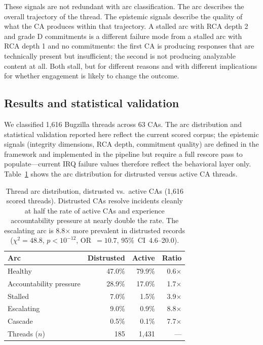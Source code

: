 \documentclass[10pt,twocolumn,letterpaper]{article}
\begin{document}
These signals are not redundant with arc classification. The arc describes the overall
trajectory of the thread. The epistemic signals describe the quality of what the CA
produces within that trajectory. A stalled arc with RCA depth 2 and grade D commitments
is a different failure mode from a stalled arc with RCA depth 1 and no commitments: the
first CA is producing responses that are technically present but insufficient; the second
is not producing analyzable content at all. Both stall, but for different reasons and with
different implications for whether engagement is likely to change the outcome.

\subsection{Results and statistical validation}

We classified 1,616 Bugzilla threads across 63 CAs. The arc distribution and statistical
validation reported here reflect the current scored corpus; the epistemic signals
(integrity dimensions, RCA depth, commitment quality) are defined in the framework and
implemented in the pipeline but require a full rescore pass to populate---current IRQ
failure values therefore reflect the behavioral layer only. Table~\ref{tab:arcs} shows
the arc distribution for distrusted versus active CA threads.

\begin{table}[t]
\centering
\footnotesize
\setlength{\tabcolsep}{4pt}
\caption{Thread arc distribution, distrusted vs.\ active CAs (1,616 scored threads).
Distrusted CAs resolve incidents cleanly at half the rate of active CAs and experience
accountability pressure at nearly double the rate. The escalating arc is 8.8$\times$
more prevalent in distrusted records ($\chi^2 = 48.8$,
$p < 10^{-12}$, OR~$= 10.7$, 95\%~CI~4.6--20.0).}
\label{tab:arcs}
\begin{tabularx}{\columnwidth}{@{}Xrrr@{}}
\toprule
Arc & Distrusted & Active & Ratio \\
\midrule
Healthy                &  47.0\% & 79.9\% & 0.6$\times$ \\
Accountability pressure & 28.9\% & 17.0\% & 1.7$\times$ \\
Stalled                &   7.0\% &  1.5\% & 3.9$\times$ \\
Escalating             &   9.0\% &  0.9\% & 8.8$\times$ \\
Cascade                &   0.5\% &  0.1\% & 7.7$\times$ \\
\midrule
Threads ($n$)          &    185  & 1,431  & --- \\
\bottomrule
\end{tabularx}
\end{table}
\end{document}
